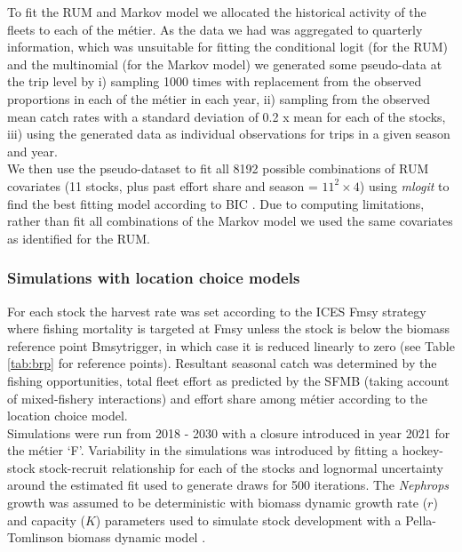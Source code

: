 \documentclass[12pt, halfline, a4paper]{ouparticle}
\begin{document}
To fit the RUM and Markov model we allocated the historical activity of the
fleets to each of the métier. As the data we had was aggregated to quarterly
information, which was unsuitable for fitting the conditional logit (for the
RUM) and the multinomial (for the Markov model) we generated some pseudo-data
at the trip level by i) sampling 1000 times with replacement from the observed
proportions in each of the métier in each year, ii) sampling from the observed
mean catch rates with a standard deviation of 0.2 x mean for each of the
stocks, iii) using the generated data as individual observations for trips in a
given season and year.  \\

We then use the pseudo-dataset to fit all 8192 possible combinations of RUM
covariates (11 stocks, plus past effort share and season = $11^2 \times 4$)
using \textit{mlogit} to find the best fitting model according to BIC
\citep{Schwarz1978}. Due to computing limitations, rather than fit all
combinations of the Markov model we used the same covariates as identified for
the RUM. 

\subsubsection{Simulations with location choice models}

For each stock the harvest rate was set according to the ICES Fmsy strategy
where fishing mortality is targeted at Fmsy unless the stock is below the
biomass reference point Bmsytrigger, in which case it is reduced linearly to
zero (see Table \ref{tab:brp} for reference points). Resultant seasonal catch
was determined by the fishing opportunities, total fleet effort as predicted by
the SFMB (taking account of mixed-fishery interactions) and effort share among
métier according to the location choice model. \\

Simulations were run from 2018 - 2030 with a closure introduced in year 2021
for the métier `F'. Variability in the simulations was introduced by fitting a
hockey-stock stock-recruit relationship for each of the stocks and lognormal
uncertainty around the estimated fit used to generate draws for 500 iterations.
The \textit{Nephrops} growth was assumed to be deterministic with biomass
dynamic growth rate ($r$) and capacity ($K$) parameters used to simulate stock
development with a Pella-Tomlinson biomass dynamic model \citep{Pella1969}. \\
\end{document}
